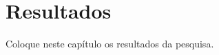 \chapter{Resultados}\label{chp:23_resultados}

\begin{resumocapitulo}
Coloque neste capítulo os resultados da pesquisa.
\end{resumocapitulo}